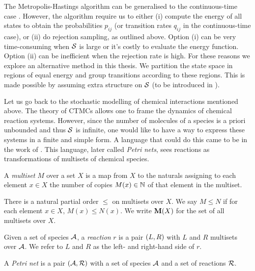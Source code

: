 The Metropolis-Hastings algorithm can be generalised
to the continuous-time case \citep{diaconis}.
However, the algorithm require us to either
(i) compute the energy of all states to obtain the probabilities
$p_{ij}$ (or transition rates $q_{ij}$ in the continuous-time case),
or (ii) do rejection sampling, as outlined above.
Option (i) can be very time-consuming when $\mathcal{S}$ is large
or it's costly to evaluate the energy function.
Option (ii) can be inefficient when the rejection rate is high.
For these reasons we explore an alternative method in this thesis.
We partition the state space in regions of equal energy
and group transitions according to these regions.
This is made possible by assuming extra structure on $\mathcal{S}$
(to be introduced in ).

Let us go back to the stochastic modelling of
chemical interactions mentioned above.
The theory of CTMCs allows one to frame
the dynamics of chemical reaction systems.
However, since the number of molecules of a species
is a priori unbounded and thus $\mathcal{S}$ is infinite,
one would like to have a way to express these systems
in a finite and simple form.
A language that could do this
came to be in the work of \citet{petri}.
This language, later called \emph{Petri nets},
sees reactions as transformations of
multisets of chemical species.

\begin{definition}
  A \emph{multiset} $M$ over a set $X$ is a map from $X$ to
  the naturals assigning to each element $x \in X$
  the number of copies $M(x) \in \mathbb{N}$ of that element
  in the multiset.
\end{definition}

There is a natural partial order $\leqslant$ on multisets over $X$.
We say $M \leqslant N$ if for each element $x \in X$,
$M(x) \leqslant N(x)$.
We write $\mathbf{M}(X)$ for the set of all multisets over $X$.


\begin{definition}
  Given a set of species $\mathcal{A}$,
  a \emph{reaction} $r$ is a pair $\left(L,R\right)$
  with $L$ and $R$ multisets over $\mathcal{A}$.
  We refer to $L$ and $R$ as the left- and right-hand side of $r$.
\end{definition}

\begin{definition}%
  A \emph{Petri net} is a pair $\left(\mathcal{A}, \mathcal{R}\right)$ with
  a set of species $\mathcal{A}$ and a set of reactions $\mathcal{R}$.
\end{definition}

